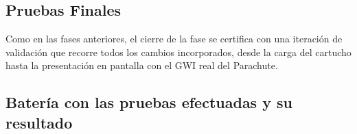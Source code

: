 \subsection{Pruebas Finales}
\label{subsec:VerificacionF2}

Como en las fases anteriores, el cierre de la fase se certifica con una
iteración de validación que recorre todos los cambios incorporados, desde la
carga del cartucho hasta la presentación en pantalla con el GWI real del
Parachute. 

\subsection{Batería con las pruebas efectuadas y su resultado}
\label{sec:BateriaPruebasFase2}


